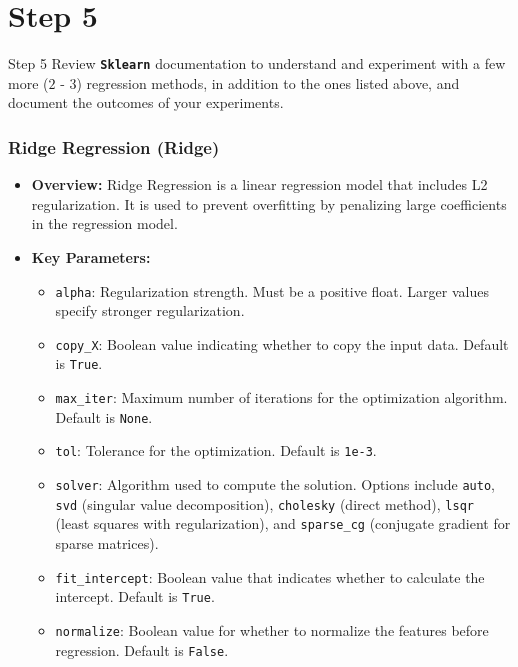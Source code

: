 \section*{Step 5}

\begin{custombox}[label={box:Q5}]{Step 5}
	Review \textbf{\texttt{Sklearn}} documentation to understand and experiment with a few more ($2$ - $3$) regression methods, in addition to the ones listed above, and document the outcomes of your experiments.
\end{custombox}

\subsubsection*{Ridge Regression (Ridge)}

\begin{itemize}
    \item \textbf{Overview:} Ridge Regression is a linear regression model that includes L2 regularization. It is used to prevent overfitting by penalizing large coefficients in the regression model.
    \item \textbf{Key Parameters:}
    \begin{itemize}
        \item \texttt{alpha}: Regularization strength. Must be a positive float. Larger values specify stronger regularization.
        \item \texttt{copy\_X}: Boolean value indicating whether to copy the input data. Default is \texttt{True}.
        \item \texttt{max\_iter}: Maximum number of iterations for the optimization algorithm. Default is \texttt{None}.
        \item \texttt{tol}: Tolerance for the optimization. Default is \texttt{1e-3}.
        \item \texttt{solver}: Algorithm used to compute the solution. Options include \texttt{auto}, \texttt{svd} (singular value decomposition), \texttt{cholesky} (direct method), \texttt{lsqr} (least squares with regularization), and \texttt{sparse\_cg} (conjugate gradient for sparse matrices).
        \item \texttt{fit\_intercept}: Boolean value that indicates whether to calculate the intercept. Default is \texttt{True}.
        \item \texttt{normalize}: Boolean value for whether to normalize the features before regression. Default is \texttt{False}.
    \end{itemize}
\end{itemize}

